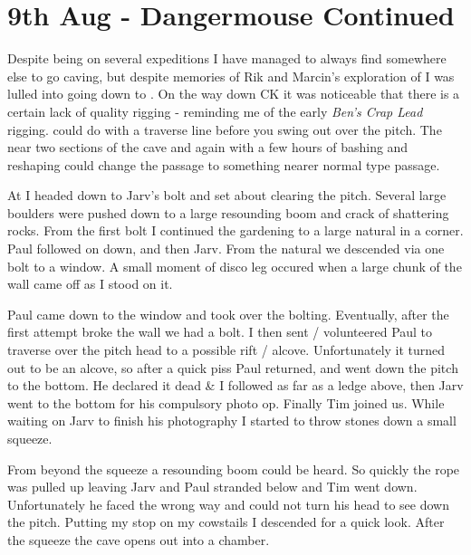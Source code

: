 \section{9th Aug - Dangermouse Continued}


Despite being on several expeditions I have managed to always find
somewhere else to go caving, but despite memories of Rik and Marcin's
exploration of  I was lulled into going down to
. On the way down CK it was noticeable that there is a
certain lack of quality rigging - reminding me of the early \textit{Ben's Crap Lead}
rigging.  could do with a traverse line before you
swing out over the pitch. The near two sections of the cave
 and  again with a few hours of bashing and
reshaping could change the passage to something nearer normal type
passage.

At  I headed down to Jarv's bolt and set about
clearing the pitch. Several large boulders were pushed down to a large
resounding boom and crack of shattering rocks. From the first bolt I
continued the gardening to a large natural in a corner. Paul followed on
down, and then Jarv. From the natural we descended via one bolt to a
window. A small moment of disco leg occured when a large chunk of the
wall came off as I stood on it.

Paul came down to the window and took over the bolting. Eventually,
after the first attempt broke the wall we had a bolt. I then sent /
volunteered Paul to traverse over the pitch head to a possible rift /
alcove. Unfortunately it turned out to be an alcove, so after a quick
piss Paul returned, and went down the pitch to the bottom. He declared
it dead \& I followed as far as a ledge above, then Jarv went to the
bottom for his compulsory photo op. Finally Tim joined us. While waiting
on Jarv to finish his photography I started to throw stones down a small
squeeze.

From beyond the squeeze a resounding boom could be heard. So quickly the
rope was pulled up leaving Jarv and Paul stranded below and Tim went
down. Unfortunately he faced the wrong way and could not turn his head
to see down the pitch. Putting my stop on my cowstails I descended for a
quick look. After the squeeze the cave opens out into a chamber.

